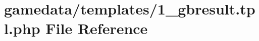 \hypertarget{1__gbresult_8tpl_8php}{\section{gamedata/templates/1\+\_\+gbresult.tpl.\+php File Reference}
\label{1__gbresult_8tpl_8php}
}
